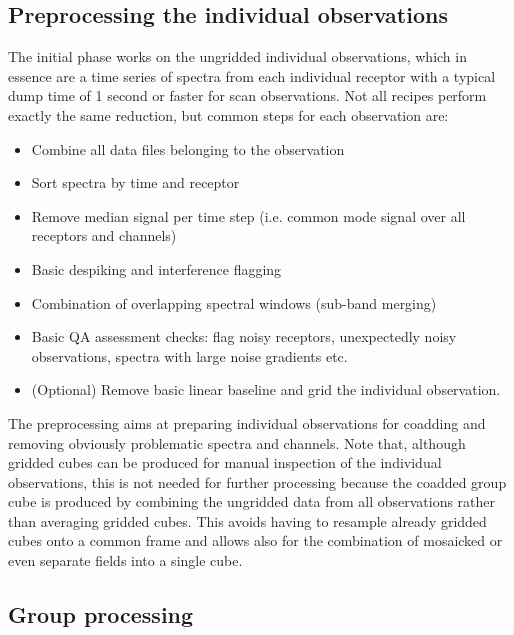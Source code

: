 \documentclass[final,authoryear,5p,times,twocolumn]{elsarticle}
\begin{document}
\subsection{Preprocessing the individual observations}

The initial phase works on the ungridded individual observations,
which in essence are a time series of spectra from each individual
receptor with a typical dump time of 1 second or faster for scan
observations.  Not all recipes perform exactly the same reduction, but
common steps for each observation are:
\begin{itemize}
\item Combine all data files belonging to the observation
\item Sort spectra by time and receptor
\item Remove median signal per time step (i.e. common mode signal over
all receptors and channels)
\item Basic despiking and interference flagging
\item Combination of overlapping spectral windows (sub-band merging)
\item Basic QA assessment checks: flag noisy receptors, unexpectedly noisy
observations, spectra with large noise gradients etc.
\item (Optional) Remove basic linear baseline and grid the individual
observation.
\end{itemize}

The preprocessing aims at preparing individual observations for
coadding and removing obviously problematic spectra and channels.
Note that, although gridded cubes can be produced for manual
inspection of the individual observations, this is not needed for
further processing because the coadded group cube is produced by
combining the ungridded data from all observations rather than
averaging gridded cubes.  This avoids having to resample already
gridded cubes onto a common frame and allows also for the combination
of mosaicked or even separate fields into a single cube.

\subsection{Group processing}
\end{document}
